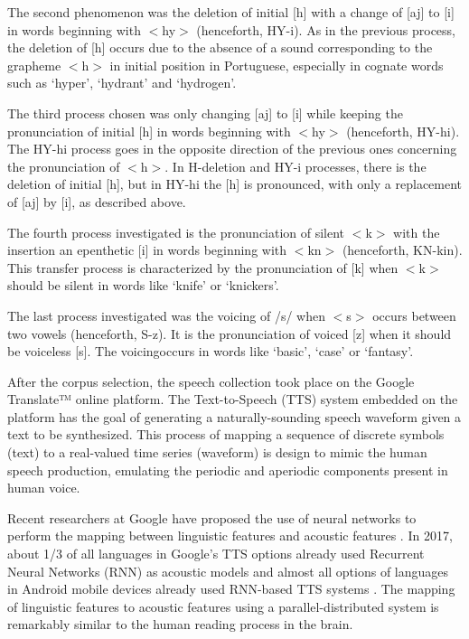 The second phenomenon was the deletion of initial [h] with a change of [aj] to
[i] in words beginning with $<$hy$>$ (henceforth, HY-i). As in the previous
process, the deletion of [h] occurs due to the absence of a sound corresponding
to the grapheme $<$h$>$ in initial position in Portuguese, especially in
cognate words such as ‘hyper’, ‘hydrant’ and ‘hydrogen’.

The third process chosen was only changing [aj] to [i] while keeping the
pronunciation of initial [h] in words beginning with $<$hy$>$ (henceforth,
HY-hi). The HY-hi process goes in the opposite direction of the previous ones
concerning the pronunciation of $<$h$>$. In H-deletion and HY-i processes,
there is the deletion of initial [h], but in HY-hi the [h] is pronounced, with
only a replacement of [aj] by [i], as described above.

The fourth process investigated is the pronunciation of silent $<$k$>$ with the
insertion an epenthetic [i] in words beginning with $<$kn$>$ (henceforth,
KN-kin). This transfer process is characterized by the pronunciation of [k]
when $<$k$>$ should be silent in words like ‘knife’ or ‘knickers’.

The last process investigated was the voicing of /s/ when $<$s$>$ occurs
between two vowels (henceforth, S-z). It is the pronunciation of voiced [z]
when it should be voiceless [s]. The voicingoccurs in words like ‘basic’,
‘case’ or ‘fantasy’.

After the corpus selection, the speech collection took place on the Google
Translate™ online platform. The Text-to-Speech (TTS) system embedded on the
platform has the goal of generating a naturally-sounding speech waveform given
a text to be synthesized. This process of mapping a sequence of discrete
symbols (text) to a real-valued time series (waveform) is design to mimic the
human speech production, emulating the periodic and aperiodic components
present in human voice.

Recent researchers at Google have proposed the use of neural networks to
perform the mapping between linguistic features and acoustic features
\citep{tokuda_directly_2016, zen_fast_2016-1}. In 2017, about 1/3 of all
languages in Google’s TTS options already used Recurrent Neural Networks (RNN)
as acoustic models and almost all options of languages in Android mobile
devices already used RNN-based TTS systems \citep{zen_generative_2017-1}. The
mapping of linguistic features to acoustic features using a
parallel-distributed system is remarkably similar to the human reading process
in the brain.

